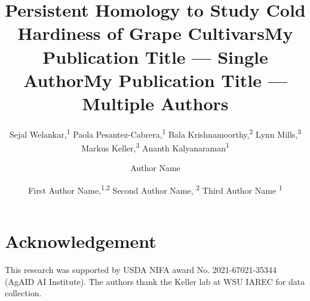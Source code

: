\documentclass[letterpaper]{article} %
\title{Persistent Homology to Study Cold Hardiness of Grape Cultivars}
\author{
    Sejal Welankar,\textsuperscript{\rm 1}
    Paola Pesantez-Cabrera,\textsuperscript{\rm 1}
    Bala Krishnamoorthy,\textsuperscript{\rm 2}
    Lynn Mills,\textsuperscript{\rm 3}
    Markus Keller,\textsuperscript{\rm 3}
    Ananth Kalyanaraman\textsuperscript{\rm 1}
}
\title{My Publication Title --- Single Author}
\author {
    Author Name
}
\title{My Publication Title --- Multiple Authors}
\author {
    First Author Name,\textsuperscript{\rm 1,\rm 2}
    Second Author Name, \textsuperscript{\rm 2}
    Third Author Name \textsuperscript{\rm 1}
}
\begin{document}
\maketitle

\begin{abstract}



\end{abstract}



%











\section*{Acknowledgement}
This research was supported by USDA NIFA award No. 2021-67021-35344 (AgAID AI Institute). 
The authors thank the Keller lab at WSU IAREC for data  collection.

\end{document}
